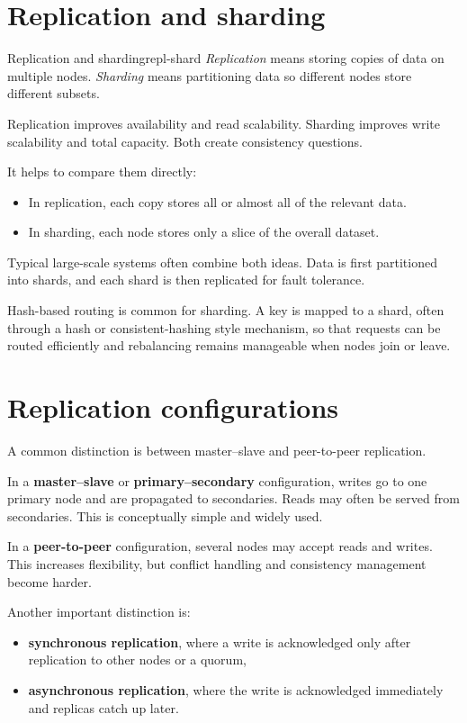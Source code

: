 \documentclass[11pt,a4paper,openany]{book}
\begin{document}
\section{Replication and sharding}
\begin{definition}{Replication and sharding}{repl-shard}
\emph{Replication} means storing copies of data on multiple nodes. \emph{Sharding} means partitioning data so different nodes store different subsets.
\end{definition}

Replication improves availability and read scalability. Sharding improves write scalability and total capacity. Both create consistency questions.

It helps to compare them directly:
\begin{itemize}
\item In replication, each copy stores all or almost all of the relevant data.
\item In sharding, each node stores only a slice of the overall dataset.
\end{itemize}

Typical large-scale systems often combine both ideas. Data is first partitioned into shards, and each shard is then replicated for fault tolerance.

Hash-based routing is common for sharding. A key is mapped to a shard, often through a hash or consistent-hashing style mechanism, so that requests can be routed efficiently and rebalancing remains manageable when nodes join or leave.

\section{Replication configurations}
A common distinction is between master--slave and peer-to-peer replication.

In a \textbf{master--slave} or \textbf{primary--secondary} configuration, writes go to one primary node and are propagated to secondaries. Reads may often be served from secondaries. This is conceptually simple and widely used.

In a \textbf{peer-to-peer} configuration, several nodes may accept reads and writes. This increases flexibility, but conflict handling and consistency management become harder.

Another important distinction is:
\begin{itemize}
\item \textbf{synchronous replication}, where a write is acknowledged only after replication to other nodes or a quorum,
\item \textbf{asynchronous replication}, where the write is acknowledged immediately and replicas catch up later.
\end{itemize}
\end{document}

